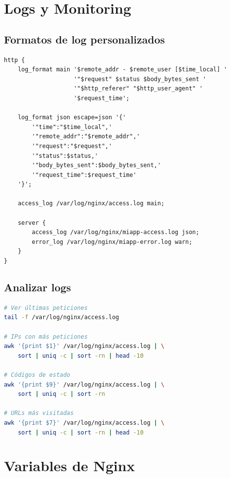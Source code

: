\documentclass[11pt,a4paper]{article}
\begin{document}
\section{Logs y Monitoring}

\subsection{Formatos de log personalizados}

\begin{lstlisting}
http {
    log_format main '$remote_addr - $remote_user [$time_local] '
                    '"$request" $status $body_bytes_sent '
                    '"$http_referer" "$http_user_agent" '
                    '$request_time';
    
    log_format json escape=json '{'
        '"time":"$time_local",'
        '"remote_addr":"$remote_addr",'
        '"request":"$request",'
        '"status":$status,'
        '"body_bytes_sent":$body_bytes_sent,'
        '"request_time":$request_time'
    '}';
    
    access_log /var/log/nginx/access.log main;
    
    server {
        access_log /var/log/nginx/miapp-access.log json;
        error_log /var/log/nginx/miapp-error.log warn;
    }
}
\end{lstlisting}

\subsection{Analizar logs}

\begin{lstlisting}[language=bash]
# Ver últimas peticiones
tail -f /var/log/nginx/access.log

# IPs con más peticiones
awk '{print $1}' /var/log/nginx/access.log | \
    sort | uniq -c | sort -rn | head -10

# Códigos de estado
awk '{print $9}' /var/log/nginx/access.log | \
    sort | uniq -c | sort -rn

# URLs más visitadas
awk '{print $7}' /var/log/nginx/access.log | \
    sort | uniq -c | sort -rn | head -10
\end{lstlisting}

\section{Variables de Nginx}
\end{document}
